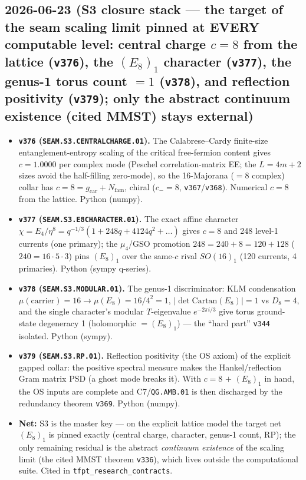 \documentclass[11pt]{article}
\providecommand{\vref}[1]{\texttt{#1}}
\providecommand{\gcar}{g_{\mathrm{car}}}\providecommand{\Nfam}{N_{\mathrm{fam}}}
\begin{document}
\subsection*{2026-06-23 (S3 closure stack --- the target of the seam scaling limit pinned at EVERY computable level: central charge $c{=}8$ from the lattice (\texttt{v376}), the $(E_8)_1$ character (\texttt{v377}), the genus-1 torus count $=1$ (\texttt{v378}), and reflection positivity (\texttt{v379}); only the abstract continuum existence (cited MMST) stays external)}
\begin{itemize}
\item \textbf{\texttt{v376} (\texttt{SEAM.S3.CENTRALCHARGE.01}).} The Calabrese--Cardy finite-size
entanglement-entropy scaling of the critical free-fermion content gives $c=1.0000$ per complex mode
(Peschel correlation-matrix EE; the $L{=}4m{+}2$ sizes avoid the half-filling zero-mode), so the
16-Majorana ($=8$ complex) collar has $c=8=\gcar{+}\Nfam$, chiral ($c_-{=}8$, \vref{v367}/\vref{v368}).
Numerical $c{=}8$ from the lattice. Python (numpy).
\item \textbf{\texttt{v377} (\texttt{SEAM.S3.E8CHARACTER.01}).} The exact affine character
$\chi = E_4/\eta^8 = q^{-1/3}(1 + 248q + 4124q^2 + \dots)$ gives $c = 8$ and 248 level-1 currents (one
primary); the $\mu_4$/GSO promotion $248 = 240 + 8 = 120 + 128$ ($240 = 16{\cdot}5{\cdot}3$) pins $(E_8)_1$
over the same-$c$ rival $SO(16)_1$ (120 currents, 4 primaries). Python (sympy q-series).
\item \textbf{\texttt{v378} (\texttt{SEAM.S3.MODULAR.01}).} The genus-1 discriminator: KLM condensation
$\mu(\text{carrier}){=}16\to\mu(E_8){=}16/4^2{=}1$, $|\det\mathrm{Cartan}(E_8)|{=}1$ vs $D_8{=}4$, and the
single character's modular $T$-eigenvalue $e^{-2\pi i/3}$ give torus ground-state degeneracy 1 (holomorphic
$=(E_8)_1$) --- the ``hard part'' \vref{v344} isolated. Python (sympy).
\item \textbf{\texttt{v379} (\texttt{SEAM.S3.RP.01}).} Reflection positivity (the OS axiom) of the explicit
gapped collar: the positive spectral measure makes the Hankel/reflection Gram matrix PSD (a ghost mode
breaks it). With $c{=}8$ $+$ $(E_8)_1$ in hand, the OS inputs are complete and C7/\texttt{QG.AMB.01} is then
discharged by the redundancy theorem \vref{v369}. Python (numpy).
\item \textbf{Net:} S3 is the master key --- on the explicit lattice model the target net $(E_8)_1$ is pinned
exactly (central charge, character, genus-1 count, RP); the only remaining residual is the abstract
\emph{continuum existence} of the scaling limit (the cited MMST theorem \vref{v336}), which lives outside the
computational suite. Cited in \texttt{tfpt\_research\_contracts}.
\end{itemize}
\end{document}
